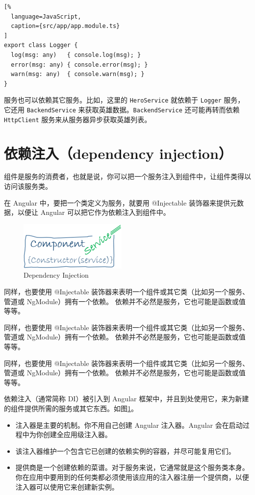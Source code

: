 \documentclass{progbookcn}
\begin{document}
\begin{lstlisting}[%
  language=JavaScript,
  caption={src/app/app.module.ts}
]
export class Logger {
  log(msg: any)   { console.log(msg); }
  error(msg: any) { console.error(msg); }
  warn(msg: any)  { console.warn(msg); }
}
\end{lstlisting}

服务也可以依赖其它服务。比如，这里的 \verb|HeroService| 就依赖于 \verb|Logger| 服务，它还用 \verb|BackendService| 来获取英雄数据。\verb|BackendService| 还可能再转而依赖 \verb|HttpClient| 服务来从服务器异步获取英雄列表。

\section{依赖注入（dependency injection）}


组件是服务的消费者，也就是说，你可以把一个服务注入到组件中，让组件类得以访问该服务类。

在 Angular 中，要把一个类定义为服务，就要用 @Injectable 装饰器来提供元数据，以便让 Angular 可以把它作为依赖注入到组件中。

\begin{figure}
  \centering
  \includegraphics[scale=.7]{figs/dependency-injection.png}
  \caption{Dependency Injection}
  \label{fig:di}
\end{figure}

同样，也要使用 @Injectable 装饰器来表明一个组件或其它类（比如另一个服务、管道或 NgModule）拥有一个依赖。 依赖并不必然是服务，它也可能是函数或值等等。

同样，也要使用 @Injectable 装饰器来表明一个组件或其它类（比如另一个服务、管道或 NgModule）拥有一个依赖。 依赖并不必然是服务，它也可能是函数或值等等。

同样，也要使用 @Injectable 装饰器来表明一个组件或其它类（比如另一个服务、管道或 NgModule）拥有一个依赖。 依赖并不必然是服务，它也可能是函数或值等等。

依赖注入（通常简称 DI）被引入到 Angular 框架中，并且到处使用它，来为新建的组件提供所需的服务或其它东西。如图\ref{fig:di}。

\begin{itemize}
  \item 注入器是主要的机制。你不用自己创建 Angular 注入器。Angular 会在启动过程中为你创建全应用级注入器。
  \item 该注入器维护一个包含它已创建的依赖实例的容器，并尽可能复用它们。
  \item 提供商是一个创建依赖的菜谱。对于服务来说，它通常就是这个服务类本身。你在应用中要用到的任何类都必须使用该应用的注入器注册一个提供商，以便注入器可以使用它来创建新实例。
\end{itemize}
\end{document}
